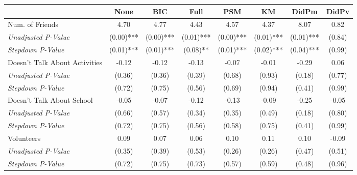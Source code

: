 \begin{tabular}{l c c c c c c c}
\toprule
 & None & BIC & Full & PSM & KM & DidPm & DidPv \\
\midrule
Num. of Friends & 4.70 & 4.77 & 4.43 & 4.57 & 4.37 & 8.07 & 0.82 \\
\quad \textit{Unadjusted P-Value} & (0.00)*** & (0.00)*** & (0.01)*** & (0.00)*** & (0.01)*** & (0.01)*** & (0.84) \\
\quad \textit{Stepdown P-Value} & (0.01)*** & (0.01)*** & (0.08)** & (0.01)*** & (0.02)*** & (0.04)*** & (0.99) \\
Doesn't Talk About Activities & -0.12 & -0.12 & -0.13 & -0.07 & -0.01 & -0.29 & 0.06 \\
\quad \textit{Unadjusted P-Value} & (0.36) & (0.36) & (0.39) & (0.68) & (0.93) & (0.18) & (0.77) \\
\quad \textit{Stepdown P-Value} & (0.72) & (0.75) & (0.56) & (0.69) & (0.94) & (0.41) & (0.99) \\
Doesn't Talk About School & -0.05 & -0.07 & -0.12 & -0.13 & -0.09 & -0.25 & -0.05 \\
\quad \textit{Unadjusted P-Value} & (0.66) & (0.57) & (0.34) & (0.35) & (0.49) & (0.18) & (0.80) \\
\quad \textit{Stepdown P-Value} & (0.72) & (0.75) & (0.56) & (0.58) & (0.75) & (0.41) & (0.99) \\
Volunteers & 0.09 & 0.07 & 0.06 & 0.10 & 0.11 & 0.10 & -0.09 \\
\quad \textit{Unadjusted P-Value} & (0.35) & (0.39) & (0.53) & (0.26) & (0.26) & (0.47) & (0.51) \\
\quad \textit{Stepdown P-Value} & (0.72) & (0.75) & (0.73) & (0.57) & (0.59) & (0.48) & (0.96) \\
\bottomrule
\end{tabular}
